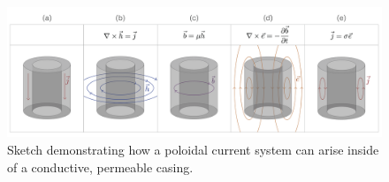 \begin{figure}[H]
    \centering
    \includegraphics[width=\columnwidth]{figures/casing-mu-sketch.png}
\caption{
    Sketch demonstrating how a poloidal current system can arise inside of a conductive, permeable casing.
    }
\label{fig:casing-mu-sketch}
\end{figure}



